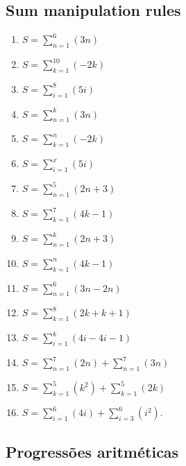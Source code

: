 \documentclass{article}
\begin{document}
\subsection{Sum manipulation rules}

\begin{enumerate}
    \item \(S = \sum_{n=1}^{6} (3n)\)
    \item \(S = \sum_{k=1}^{10} (-2k)\)
    \item \(S = \sum_{i=1}^{8} (5i)\)
    \item \(S = \sum_{n=1}^{k} (3n)\)
    \item \(S= \sum_{k=1}^{n} (-2k)\)
    \item \(S = \sum_{i=1}^{x} (5i)\)
    \item \(S = \sum_{n=1}^{5} (2n + 3)\)
    \item \(S = \sum_{k=1}^{7} (4k - 1)\)
    \item \(S = \sum_{n=1}^{k} (2n + 3)\)
    \item \(S = \sum_{k=1}^{n} (4k - 1)\)
    \item \(S = \sum_{n=1}^{6} (3n - 2n)\)
    \item \(S = \sum_{k=1}^{8} (2k + k+1)\)
    \item \(S = \sum_{i=1}^{k} (4i - 4i-1)\)
    \item \(S = \sum_{n=1}^{7} (2n) + \sum_{n=1}^{7} (3n)\)
    \item \(S = \sum_{k=1}^{5} (k^2) + \sum_{k=1}^{5} (2k)\)
    \item \(S = \sum_{i=1}^{6} (4i) + \sum_{i=3}^{6} (i^2)\).
\end{enumerate}

\subsection{Progressões aritméticas}
\end{document}
